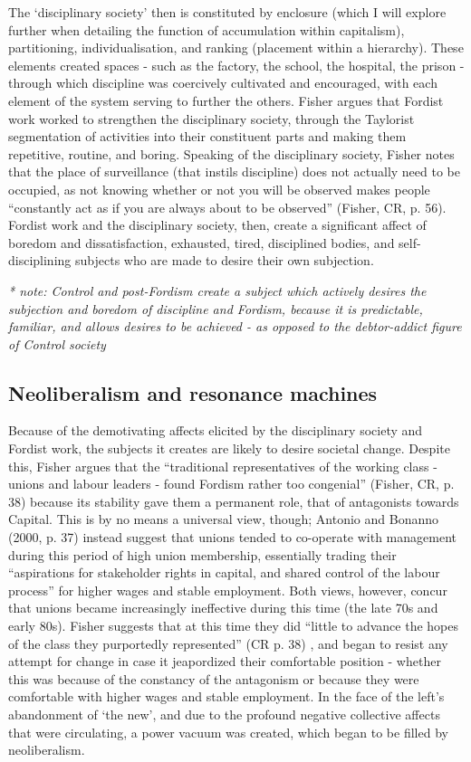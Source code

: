 The `disciplinary society' then is constituted by enclosure (which I
will explore further when detailing the function of accumulation within
capitalism), partitioning, individualisation, and ranking (placement
within a hierarchy). These elements created spaces - such as the
factory, the school, the hospital, the prison - through which discipline
was coercively cultivated and encouraged, with each element of the
system serving to further the others. Fisher argues that Fordist work
worked to strengthen the disciplinary society, through the Taylorist
segmentation of activities into their constituent parts and making them
repetitive, routine, and boring. Speaking of the disciplinary society,
Fisher notes that the place of surveillance (that instils discipline)
does not actually need to be occupied, as not knowing whether or not you
will be observed makes people ``constantly act as if you are always
about to be observed'' (Fisher, CR, p. 56). Fordist work and the
disciplinary society, then, create a significant affect of boredom and
dissatisfaction, exhausted, tired, disciplined bodies, and
self-disciplining subjects who are made to desire their own subjection.

\emph{\emph{* note: Control and post-Fordism create a subject which
actively desires the subjection and boredom of discipline and Fordism,
because it is predictable, familiar, and allows desires to be achieved -
as opposed to the debtor-addict figure of Control society}}

\subsection{Neoliberalism and resonance machines}
\label{neoliberalism-and-resonance-machines}

Because of the demotivating affects elicited by the disciplinary society
and Fordist work, the subjects it creates are likely to desire societal
change. Despite this, Fisher argues that the ``traditional
representatives of the working class - unions and labour leaders - found
Fordism rather too congenial'' (Fisher, CR, p. 38) because its stability
gave them a permanent role, that of antagonists towards Capital. This is
by no means a universal view, though; Antonio and Bonanno (2000, p. 37)
instead suggest that unions tended to co-operate with management during
this period of high union membership, essentially trading their
``aspirations for stakeholder rights in capital, and shared control of
the labour process'' for higher wages and stable employment. Both views,
however, concur that unions became increasingly ineffective during this
time (the late 70s and early 80s). Fisher suggests that at this time
they did ``little to advance the hopes of the class they purportedly
represented'' (CR p. 38) , and began to resist any attempt for change in
case it jeapordized their comfortable position - whether this was
because of the constancy of the antagonism or because they were
comfortable with higher wages and stable employment. In the face of the
left's abandonment of `the new', and due to the profound negative
collective affects that were circulating, a power vacuum was created,
which began to be filled by neoliberalism.

